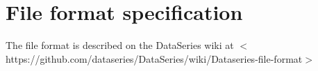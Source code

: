 \section{File format specification}

The file format is described on the DataSeries wiki at $<$https://github.com/dataseries/DataSeries/wiki/Dataseries-file-format$>$
